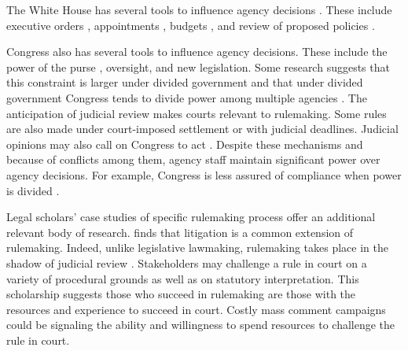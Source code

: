 
The White House has several tools to influence agency decisions \citep{Yackee2009RegGov,Simon1954}. These include executive orders \citep{Mayer1999}, appointments \citep{Doherty2014,Lewis2008,Wood1988}, budgets \citep{Whittington2003}, and review of proposed policies \citep{Haeder2015, Acs2013}. 

Congress also has several tools to influence agency decisions. These include the power of the purse \citep{Fenno1986,Bolton2015}, oversight, and new legislation. Some research suggests that this constraint is larger under divided government \citep{Yackee2009RegGov} %
and that under divided government Congress tends to divide power among multiple agencies \citep{Farhang2016}.
The anticipation of judicial review makes courts relevant to rulemaking. Some rules are also made under court-imposed settlement or with judicial deadlines. Judicial opinions may also call on Congress to act \citep{Yaver2017}.
Despite these mechanisms and because of conflicts among them, agency staff maintain significant power over agency decisions. For example, Congress is less assured of compliance when power is divided \citep{Yaver2016}.

Legal scholars' case studies of specific rulemaking process offer an additional relevant body of research. \citet{Coglianese1997} finds that litigation is a common extension of rulemaking. Indeed, unlike legislative lawmaking, rulemaking takes place in the shadow of judicial review \citep{Rossi2001}.
Stakeholders may challenge a rule in court on a variety of procedural grounds as well as on statutory interpretation. This scholarship suggests those who succeed in rulemaking are those with the resources and experience to succeed in court. Costly mass comment campaigns could be signaling the ability and willingness to spend resources to challenge the rule in court. 

